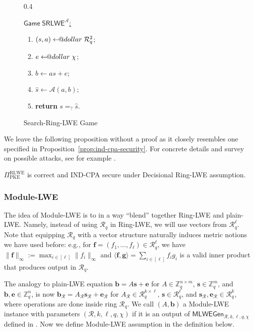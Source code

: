 \documentclass{template}
\makeatletter
\newcommand\leftarrowS{\leftarrow\joinrel\smalldollar}
\newcommand{\smalldollar}{\mathrel{\mathpalette\small@dollar\relax}}
\newcommand{\small@dollar}[2]{%
  \vcenter{\hbox{%
    $#1\textnormal{\fontsize{0.7\dimexpr\f@size pt}{0}\selectfont\$}$%
  }}%
}
\makeatother
\begin{document}
\begin{figure}[ht]
\centering
\begin{varwidth}{0.4\linewidth}
\begin{mdframed}[linecolor=black, linewidth=1pt,
                         skipabove=10pt, skipbelow=10pt]
\colorbox{green!10}{\underline{$\mathsf{Game} \; \mathsf{SRLWE}^{\mathcal{A}}$:}}
\begin{enumerate}
    \item $(s,a) \leftarrowS \mathcal{R}_q^2$;
    \item $e \leftarrowS \chi$;
    \item $b \gets as + e$;
    \item $\widehat{s} \gets \mathcal{A}(a,b)$;
    \item \textbf{return} $s =_? \widehat{s}$.
\end{enumerate}
\end{mdframed}
\end{varwidth}
\caption{Search-Ring-LWE Game} 
\label{fig:search-rlwe}
\end{figure}

We leave the following proposition without a proof as it closely resembles one
specified in Proposition~\ref{prop:ind-cpa-security}. For concrete details and
survey on possible attacks, see for example \cite{lac}.
\begin{proposition}
    $\Pi_{\text{PKE}}^{\text{RLWE}}$ is correct and IND-CPA secure under Decisional Ring-LWE
    assumption.
\end{proposition}

\subsubsection{Module-LWE}

The idea of Module-LWE is to in a way ``blend'' together Ring-LWE and plain-LWE.
Namely, instead of using $\mathcal{R}_q$ in Ring-LWE, we will use vectors from
$\mathcal{R}_q^{\ell}$. Note that equipping $\mathcal{R}_q$ with a vector
structure naturally induces metric notions we have used before: e.g., for
$\bm{f}=(f_1,\dots,f_{\ell}) \in \mathcal{R}_q^{\ell}$, we have
$\|\bm{f}\|_{\infty} := \max_{i \in [\ell]}\|f_i\|_{\infty}$ and $\langle
\bm{f}, \bm{g} \rangle = \sum_{i \in [\ell]}f_ig_i$ is a valid inner product
that produces output in $\mathcal{R}_q$. 

The analogy to plain-LWE equation $\mathbf{b} = A\mathbf{s}+\mathbf{e}$ for $A
\in \mathbb{Z}_q^{n \times m}$, $\mathbf{s} \in \mathbb{Z}_q^m$, and
$\mathbf{b},\mathbf{e} \in \mathbb{Z}_q^n$, is now $\mathbf{b}_{\mathcal{R}} =
A_{\mathcal{R}}\mathbf{s}_{\mathcal{R}} + \mathbf{e}_{\mathcal{R}}$ for
$A_{\mathcal{R}} \in \mathcal{R}_q^{k \times \ell}$, $\mathbf{s} \in
\mathcal{R}_q^{\ell}$, and $\mathbf{s}_{\mathcal{R}},\mathbf{e}_{\mathcal{R}}
\in \mathcal{R}_q^{k}$, where operations are done inside ring $\mathcal{R}_q$.
We call $(A,\mathbf{b})$ a Module-LWE instance with parameters
$(\mathcal{R},k,\ell,q,\chi)$ if it is an output of $\mathsf{MLWEGen}_{\mathcal{R},k,\ell,q,\chi}$
defined in . Now we define Module-LWE assumption in the 
definition below.
\end{document}

